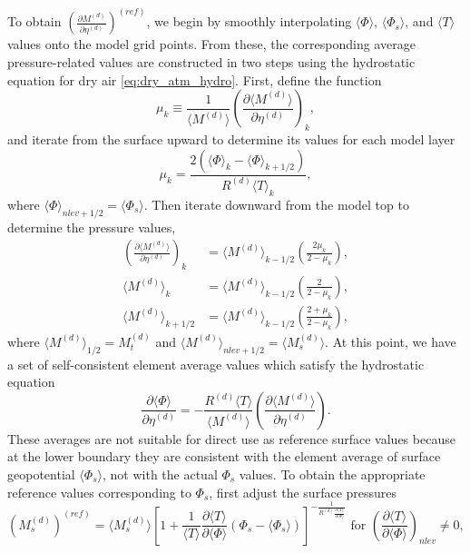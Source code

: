 \documentclass{agujournal}
\begin{document}
To obtain $\left( \frac{\partial M^{(d)}}{\partial \eta^{(d)}}\right)^{(ref)}$, we begin by smoothly interpolating $\langle \Phi \rangle$, $\langle \Phi_s \rangle$, and $\langle T \rangle$ values onto the model grid points. From these, the corresponding average pressure-related values are constructed in two steps using the hydrostatic equation for dry air \eqref{eq:dry_atm_hydro}. First, define the function
\begin{equation}
\mu_k \equiv \frac{1}{\langle M^{(d)} \rangle} \left( \frac{\partial \langle M^{(d)}\rangle}{\partial \eta^{(d)}}\right)_k,
\end{equation}
and iterate from the surface upward to determine its values for each model layer
\begin{equation}
\mu_k=\frac{2\left( \langle \Phi \rangle_k-\langle \Phi \rangle_{k+1/2} \right)}{R^{(d)}\langle T \rangle_k},
\end{equation}
where $\langle \Phi \rangle_{nlev+1/2}=\langle \Phi_s \rangle$. Then iterate downward from the model top to determine the pressure values,
\begin{align}
\left( \frac{\partial \langle M^{(d)}\rangle}{\partial \eta^{(d)}}\right)_k &= \langle M^{(d)} \rangle_{k-1/2}\left( \frac{2\mu_k}{2-\mu_k}\right),\\
\langle M^{(d)} \rangle_{k}&=\langle M^{(d)} \rangle_{k-1/2}\left( \frac{2}{2-\mu_k}\right),\\
\langle M^{(d)} \rangle_{k+1/2}&=\langle M^{(d)} \rangle_{k-1/2}\left( \frac{2+\mu_k}{2-\mu_k}\right),
\end{align}
where $\langle M^{(d)} \rangle_{1/2}=M^{(d)}_t$ and  $\langle M^{(d)} \rangle_{nlev+1/2}=\langle M^{(d)}_s \rangle$. At this point, we have a set of self-consistent element average values which satisfy the hydrostatic equation
\begin{equation}
\frac{\partial \langle \Phi \rangle}{\partial \eta^{(d)}}=-\frac{R^{(d)}\langle T\rangle}{\langle M^{(d)}\rangle}\left( \frac{\partial \langle M^{(d)}\rangle}{\partial \eta^{(d)}}\right).
\end{equation}
These averages are not suitable for direct use as reference surface values because at the lower boundary they are consistent with the element average of surface geopotential $\langle \Phi_s \rangle$, not with the actual $\Phi_s$ values. To obtain the appropriate reference values corresponding to $\Phi_s$, first adjust the surface pressures
\begin{equation}
\left( M^{(d)}_s \right)^{(ref)}=\langle M^{(d)}_s \rangle\left[ 1+\frac{1}{\langle T\rangle}\frac{\partial \langle T\rangle}{\partial \langle \Phi \rangle}\left( \Phi_s-\langle \Phi_s\rangle \right)\right]^{-\frac{1}{R^{(d)}\frac{\partial \langle T\rangle}{\partial \langle \Phi \rangle}}}\text{ for }\left( \frac{\partial \langle T\rangle}{\partial \langle \Phi \rangle}\right)_{nlev}\neq 0,
\end{equation}
\end{document}
